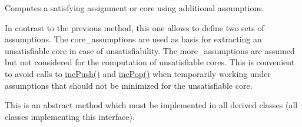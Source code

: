 Computes a satisfying assignment or core using additional assumptions. 

In contrast to the previous method, this one allows to define two sets of assumptions. The core\-\_\-assumptions are used as basis for extracting an unsatisfiable core in case of unsatisfiability. The more\-\_\-assumptions are assumed but not considered for the computation of unsatisfiable cores. This is convenient to avoid calls to \hyperlink{classSatSolver_a4da0dff7082a91429e3311d279605be4}{inc\-Push()} and \hyperlink{classSatSolver_a436aae045eb04141c834df0b55947ee5}{inc\-Pop()} when temporarily working under assumptions that should not be minimized for the unsatisfiable core.

This is an abstract method which must be implemented in all derived classes (all classes implementing this interface).


